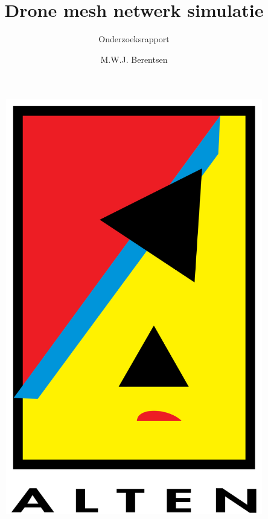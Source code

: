 \documentclass[a4paper, 11pt, oneside]{report}
\author{M.W.J. Berentsen}
\title{\myfont Drone mesh netwerk simulatie}
\subtitle{Onderzoeksrapport}{HAN Arnhem}{561399}{MWJ.Berentsen@student.han.nl}{Versie 1}{Alten Nederland B.V.}{Docent: J. Visch, MSc}{Assessor: ir. C.G.R. van Uffelen}
\begin{document}
\begin{figure}
\begin{center}\includegraphics[scale=0.1]{alten}\end{center}
\end{figure}
\maketitle

\end{document}
